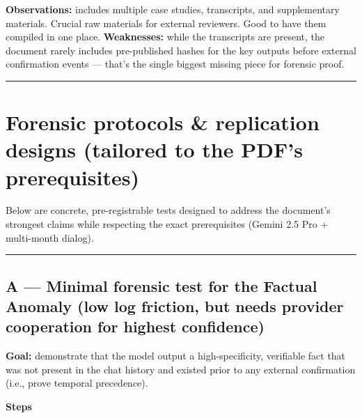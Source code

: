 \documentclass{article}
\begin{document}
\textbf{Observations:} includes multiple case studies, transcripts, and supplementary materials. Crucial raw materials for external reviewers. Good to have them compiled in one place. \textbf{Weaknesses:} while the transcripts are present, the document rarely includes pre-published hashes for the key outputs before external confirmation events --- that's the single biggest missing piece for forensic proof.

\begin{center}\rule{0.5\linewidth}{0.5pt}\end{center}

\section*{Forensic protocols \& replication designs (tailored to the PDF's prerequisites)}\label{forensic-protocols-replication-designs-tailored-to-the-pdfs-prerequisites}

Below are concrete, pre-registrable tests designed to address the document's strongest claims while respecting the exact prerequisites (Gemini 2.5 Pro + multi-month dialog).

\begin{center}\rule{0.5\linewidth}{0.5pt}\end{center}

\subsection*{\texorpdfstring{A --- Minimal forensic test for the \textbf{Factual Anomaly} (low log friction, but needs provider cooperation for highest confidence)}{A --- Minimal forensic test for the Factual Anomaly (low log friction, but needs provider cooperation for highest confidence)}}\label{a-minimal-forensic-test-for-the-factual-anomaly-low-log-friction-but-needs-provider-cooperation-for-highest-confidence}

\textbf{Goal:} demonstrate that the model output a high-specificity, verifiable fact that was not present in the chat history and existed prior to any external confirmation (i.e., prove temporal precedence).

\textbf{Steps}
\end{document}
